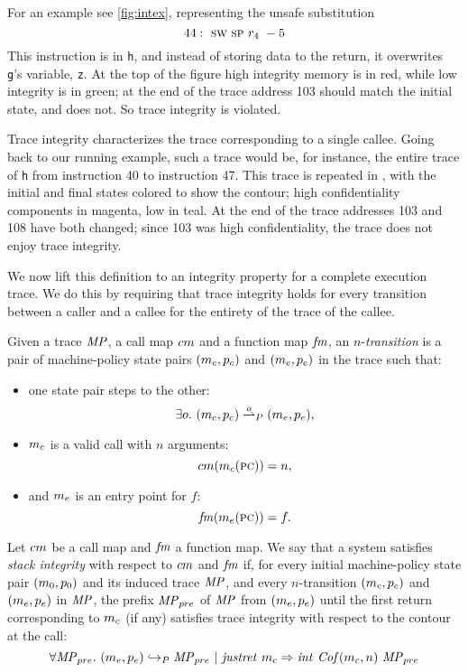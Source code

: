 \documentclass[acmsmall,review,anonymous]{acmart}\settopmatter{printfolios=true,printccs=false,printacmref=false}
\begin{document}
For an example see \cref{fig:intex}, representing the unsafe substitution
\[
  44: ~ \textsc{sw} ~ \textsc{sp} ~ r_4 ~ -5
\]
This instruction is in {\tt h}, and instead of storing data to the return,
it overwrites {\tt g}'s variable, {\tt z}. At the top of the figure high
integrity memory is in red, while low integrity is in green; at the end of the
trace address 103 should match the initial state, and does not. So trace
integrity is violated.

Trace integrity characterizes the trace corresponding to a single
callee. Going back to our running example, such a trace would be, for
instance, the entire trace of {\tt h} from instruction 40 to
instruction 47. This trace is repeated in , with the initial
and final states colored to show the contour; high confidentiality
components in magenta, low in teal. At the end of the trace addresses 103
and 108 have both changed; since 103 was high confidentiality, the trace
does not enjoy trace integrity.

We now lift this definition to an integrity property for a complete
execution trace. We do this by requiring that trace integrity holds
for every transition between a caller and a callee for the entirety of
the trace of the callee.

 Given a trace $\mathit{MP}$, a call map $cm$ and
a function map $\mathit{fm}$, an $n$-{\em transition} is a pair of
machine-policy state pairs $(m_c, p_c)$ and $(m_e, p_e)$
in the trace such that:
\begin{itemize}
\item one state pair steps to the other:
  $$\exists o. ~ (m_c, p_c) \overset{o}{\rightharpoonup}_P (m_e, p_e),$$
\item $m_c$ is a valid call with $n$ arguments:
  $$cm(m_c(\textsc{pc})) = n,$$
\item and $m_e$ is an entry point for $f$:
  $$\mathit{fm}(m_e(\textsc{pc})) = f.$$
\end{itemize}

 Let $cm$ be a call map and
$\mathit{fm}$ a function map. We say that a system satisfies {\em stack
  integrity} with respect to $cm$ and $\mathit{fm}$ if, for every
initial machine-policy state pair $(m_0, p_0)$ and its induced
trace $\mathit{MP}$, and every $n$-transition $(m_c, p_c)$ and
$(m_e, p_e)$ in $\mathit{MP}$, the prefix $\mathit{MP}_{pre}$ of $\mathit{MP}$ from
$(m_e, p_e)$ until the first return corresponding to $m_c$
(if any) satisfies trace integrity with respect to the contour at the
call:
%
$$\forall \mathit{MP}_{pre}. ~ (m_e,p_e) \hookrightarrow_P
\mathit{MP}_{pre} ~ | ~ \mathit{justret}\ m_c \Rightarrow
\mathit{int}~\mathit{Cof}(m_c, n)~\mathit{MP}_{pre}$$
\end{document}

